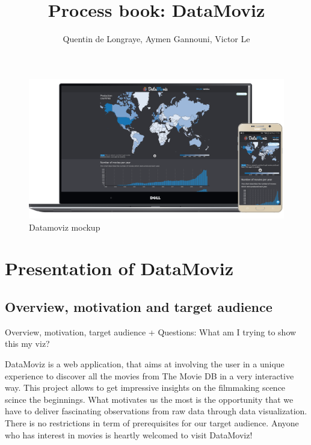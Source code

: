 \documentclass[a4paper,10pt]{article}
\begin{document}
\title{Process book: DataMoviz}
\author{Quentin de Longraye, Aymen Gannouni, Victor Le}

\maketitle

\begin{figure}[ht]
   \centering
   \includegraphics[width=1\linewidth]{../docs/mockup.png}
  \caption{Datamoviz mockup}
\end{figure}

\setlength{\parskip}{0.1\baselineskip}

\tableofcontents

\setlength{\parskip}{0.4\baselineskip}

\newpage

\section{Presentation of DataMoviz}

\subsection{Overview, motivation and target audience}
Overview, motivation, target audience
+ Questions: What am I trying to show this my viz?

DataMoviz is a web application, that aims at involving the user in a unique experience to discover all the movies from The Movie DB in a very interactive way. This project allows to get impressive insights on the filmmaking scence scince the beginnings.
What motivates us the most is the opportunity that we have to deliver fascinating observations from raw data through data visualization.
There is no restrictions in term of prerequisites for our target audience. Anyone who has interest in movies is heartly welcomed to visit DataMoviz!
\end{document}
